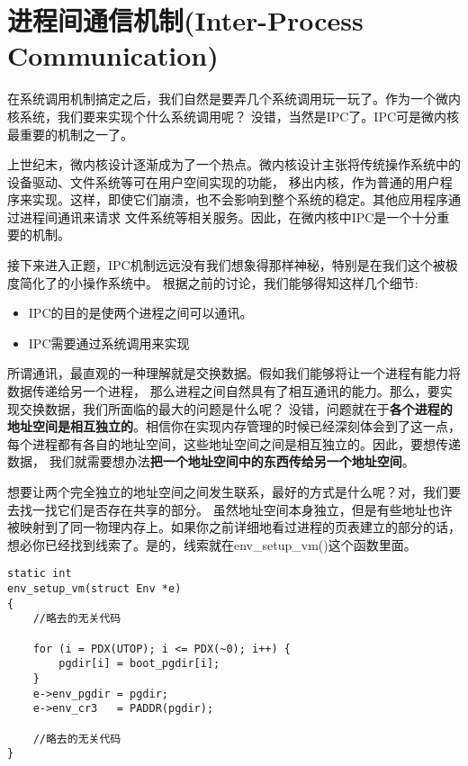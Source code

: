 \section{进程间通信机制(Inter-Process Communication)}
在系统调用机制搞定之后，我们自然是要弄几个系统调用玩一玩了。作为一个微内核系统，我们要来实现个什么系统调用呢？
没错，当然是IPC了。IPC可是微内核最重要的机制之一了。

\begin{note}
上世纪末，微内核设计逐渐成为了一个热点。微内核设计主张将传统操作系统中的设备驱动、文件系统等可在用户空间实现的功能，
移出内核，作为普通的用户程序来实现。这样，即使它们崩溃，也不会影响到整个系统的稳定。其他应用程序通过进程间通讯来请求
文件系统等相关服务。因此，在微内核中IPC是一个十分重要的机制。
\end{note}

接下来进入正题，IPC机制远远没有我们想象得那样神秘，特别是在我们这个被极度简化了的小操作系统中。
根据之前的讨论，我们能够得知这样几个细节:

\begin{itemize}
  \item IPC的目的是使两个进程之间可以通讯。
  \item IPC需要通过系统调用来实现
\end{itemize}

所谓通讯，最直观的一种理解就是交换数据。假如我们能够将让一个进程有能力将数据传递给另一个进程，
那么进程之间自然具有了相互通讯的能力。那么，要实现交换数据，我们所面临的最大的问题是什么呢？
没错，问题就在于\textbf{各个进程的地址空间是相互独立的}。相信你在实现内存管理的时候已经深刻体会到了这一点，
每个进程都有各自的地址空间，这些地址空间之间是相互独立的。因此，要想传递数据，
我们就需要想办法\textbf{把一个地址空间中的东西传给另一个地址空间}。

想要让两个完全独立的地址空间之间发生联系，最好的方式是什么呢？对，我们要去找一找它们是否存在共享的部分。
虽然地址空间本身独立，但是有些地址也许被映射到了同一物理内存上。如果你之前详细地看过进程的页表建立的部分的话，
想必你已经找到线索了。是的，线索就在env\_setup\_vm()这个函数里面。

\begin{verbatim}
static int
env_setup_vm(struct Env *e)
{
    //略去的无关代码

    for (i = PDX(UTOP); i <= PDX(~0); i++) {
        pgdir[i] = boot_pgdir[i];
    }
    e->env_pgdir = pgdir;
    e->env_cr3   = PADDR(pgdir);

    //略去的无关代码
}
\end{verbatim}


